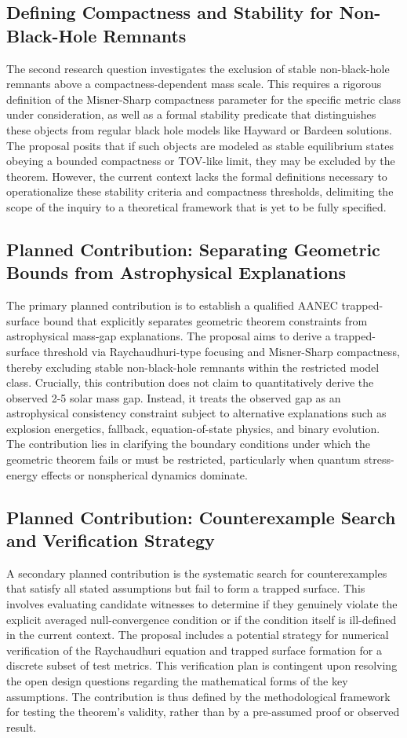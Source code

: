 \documentclass[conference]{IEEEtran}
\begin{document}
\subsection{Defining Compactness and Stability for Non-Black-Hole Remnants}
The second research question investigates the exclusion of stable non-black-hole remnants above a compactness-dependent mass scale. This requires a rigorous definition of the Misner-Sharp compactness parameter for the specific metric class under consideration, as well as a formal stability predicate that distinguishes these objects from regular black hole models like Hayward or Bardeen solutions. The proposal posits that if such objects are modeled as stable equilibrium states obeying a bounded compactness or TOV-like limit, they may be excluded by the theorem. However, the current context lacks the formal definitions necessary to operationalize these stability criteria and compactness thresholds, delimiting the scope of the inquiry to a theoretical framework that is yet to be fully specified.

\subsection{Planned Contribution: Separating Geometric Bounds from Astrophysical Explanations}
The primary planned contribution is to establish a qualified AANEC trapped-surface bound that explicitly separates geometric theorem constraints from astrophysical mass-gap explanations. The proposal aims to derive a trapped-surface threshold via Raychaudhuri-type focusing and Misner-Sharp compactness, thereby excluding stable non-black-hole remnants within the restricted model class. Crucially, this contribution does not claim to quantitatively derive the observed 2-5 solar mass gap. Instead, it treats the observed gap as an astrophysical consistency constraint subject to alternative explanations such as explosion energetics, fallback, equation-of-state physics, and binary evolution. The contribution lies in clarifying the boundary conditions under which the geometric theorem fails or must be restricted, particularly when quantum stress-energy effects or nonspherical dynamics dominate.

\subsection{Planned Contribution: Counterexample Search and Verification Strategy}
A secondary planned contribution is the systematic search for counterexamples that satisfy all stated assumptions but fail to form a trapped surface. This involves evaluating candidate witnesses to determine if they genuinely violate the explicit averaged null-convergence condition or if the condition itself is ill-defined in the current context. The proposal includes a potential strategy for numerical verification of the Raychaudhuri equation and trapped surface formation for a discrete subset of test metrics. This verification plan is contingent upon resolving the open design questions regarding the mathematical forms of the key assumptions. The contribution is thus defined by the methodological framework for testing the theorem's validity, rather than by a pre-assumed proof or observed result.
\end{document}

